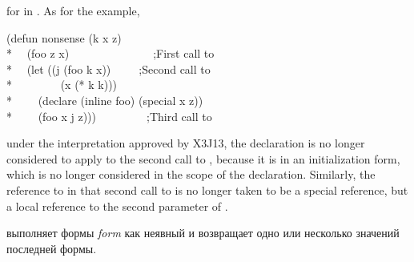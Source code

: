 \begin{defspec}
\begin{new}
for  in .  As for the  example,
\begin{lisp}
(defun nonsense (k x z) \\*
~~(foo z x)~~~~~~~~~~~~~~~;\textrm{First call to } \\*
~~(let ((j (foo k x))~~~~~;\textrm{Second call to } \\*
~~~~~~~~(x (* k k))) \\*
~~~~(declare (inline foo) (special x z)) \\*
~~~~(foo x j z)))~~~~~~~~~;\textrm{Third call to }
\end{lisp}
under the interpretation approved by X3J13, the 
declaration is no longer considered to apply to the second
call to , because it is in an initialization form, which is
no longer considered in the scope of the declaration.  Similarly,
the reference to  in that second call to  is no longer
taken to be a special reference, but a local reference to the second
parameter of .
\end{new}
\end{defspec}

 выполняет формы \emph{form} как неявный  и возвращает
одно или несколько значений последней формы.

